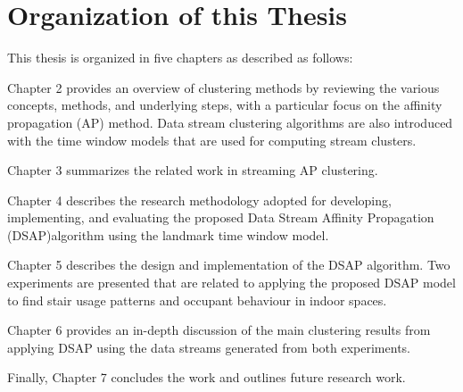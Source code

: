 

\section{Organization of this Thesis}
This thesis is organized in five chapters as described as follows:

Chapter 2 provides an overview of clustering methods by reviewing the various concepts, methods, and underlying steps, with a particular focus on the affinity propagation (AP) method.  Data stream clustering algorithms are also introduced with the time window models that are used for computing stream clusters.

Chapter 3 summarizes the related work in streaming AP clustering.

Chapter 4 describes the research methodology adopted for developing, implementing, and evaluating the proposed Data Stream Affinity Propagation (DSAP)algorithm using the landmark time window model. 

Chapter 5 describes the  design  and  implementation  of  the  DSAP  algorithm. Two  experiments  are  presented  that  are  related  to  applying  the proposed DSAP model to find stair usage patterns and occupant behaviour in indoor spaces.

Chapter 6 provides an in-depth discussion of the main  clustering  results  from  applying DSAP using  the  data  streams  generated  from  both  experiments. 

Finally, Chapter 7 concludes the work and outlines future research work.
% 







